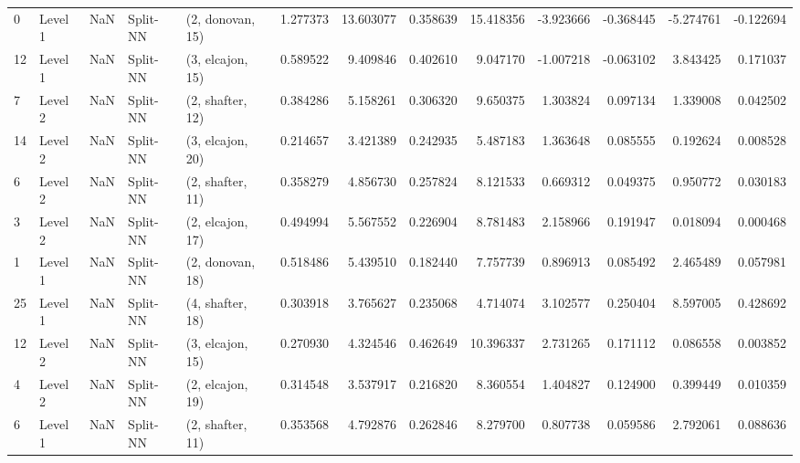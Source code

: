 \begin{tabular}{llrllrrrrrrrr}
0  &   Level 1 &    NaN &       Split-NN &  (2, donovan, 15) &   1.277373 &  13.603077 &  0.358639 &  15.418356 &            -3.923666 &              -0.368445 &           -5.274761 &             -0.122694 \\
12 &   Level 1 &    NaN &       Split-NN &  (3, elcajon, 15) &   0.589522 &   9.409846 &  0.402610 &   9.047170 &            -1.007218 &              -0.063102 &            3.843425 &              0.171037 \\
7  &   Level 2 &    NaN &       Split-NN &  (2, shafter, 12) &   0.384286 &   5.158261 &  0.306320 &   9.650375 &             1.303824 &               0.097134 &            1.339008 &              0.042502 \\
14 &   Level 2 &    NaN &       Split-NN &  (3, elcajon, 20) &   0.214657 &   3.421389 &  0.242935 &   5.487183 &             1.363648 &               0.085555 &            0.192624 &              0.008528 \\
6  &   Level 2 &    NaN &       Split-NN &  (2, shafter, 11) &   0.358279 &   4.856730 &  0.257824 &   8.121533 &             0.669312 &               0.049375 &            0.950772 &              0.030183 \\
3  &   Level 2 &    NaN &       Split-NN &  (2, elcajon, 17) &   0.494994 &   5.567552 &  0.226904 &   8.781483 &             2.158966 &               0.191947 &            0.018094 &              0.000468 \\
1  &   Level 1 &    NaN &       Split-NN &  (2, donovan, 18) &   0.518486 &   5.439510 &  0.182440 &   7.757739 &             0.896913 &               0.085492 &            2.465489 &              0.057981 \\
25 &   Level 1 &    NaN &       Split-NN &  (4, shafter, 18) &   0.303918 &   3.765627 &  0.235068 &   4.714074 &             3.102577 &               0.250404 &            8.597005 &              0.428692 \\
12 &   Level 2 &    NaN &       Split-NN &  (3, elcajon, 15) &   0.270930 &   4.324546 &  0.462649 &  10.396337 &             2.731265 &               0.171112 &            0.086558 &              0.003852 \\
4  &   Level 2 &    NaN &       Split-NN &  (2, elcajon, 19) &   0.314548 &   3.537917 &  0.216820 &   8.360554 &             1.404827 &               0.124900 &            0.399449 &              0.010359 \\
6  &   Level 1 &    NaN &       Split-NN &  (2, shafter, 11) &   0.353568 &   4.792876 &  0.262846 &   8.279700 &             0.807738 &               0.059586 &            2.792061 &              0.088636 \\

\end{tabular}

